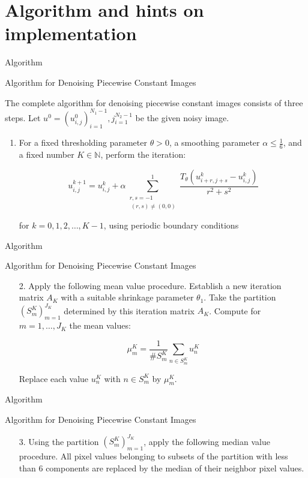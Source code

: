 \documentclass{beamer}
\begin{document}
\section{Algorithm and hints on implementation}
\begin{frame}{Algorithm}
\begin{block}{Algorithm for Denoising Piecewise Constant Images}
    

The complete algorithm for denoising piecewise constant images consists of three steps. Let $u^0 = (u^0_{i,j})_{i=1}^{N_1 -1},j_{i=1}^{N_2-1}$ be the given noisy image.
\begin{enumerate}
    \item For a fixed thresholding parameter $\theta > 0$, a smoothing parameter $\alpha \leq \frac{1}{6}$, and a fixed number $K \in \mathbb{N}$, perform the iteration:

\[
u^{k+1}_{i,j} = u^k_{i,j} + \alpha \sum_{\substack{r,s=-1 \\ \ (r,s) \neq (0,0)}}^{1} \frac{T_{\theta}(u^k_{i+r,j+s} - u^k_{i,j})}{r^2 + s^2}
\]

for $k = 0, 1, 2, \ldots, K-1$, using periodic boundary conditions

\end{enumerate}
\end{block}
  
\end{frame}
\begin{frame}{Algorithm}
\begin{block}{Algorithm for Denoising Piecewise Constant Images}
    

\begin{enumerate}
    \item[2.] Apply the following mean value procedure. Establish a new iteration matrix $A_K$  with a suitable shrinkage parameter $\theta_1$. Take the partition $(S^K_m)^{J_K}_{m=1}$ determined by this iteration matrix $A_K$. Compute for $m = 1, \ldots, J_K$ the mean values:

\[
\mu^K_m = \frac{1}{{\#S^K_m}} \sum_{n \in S^K_m} u^K_n
\]

Replace each value $u^K_n$ with $n \in S^K_m$ by $\mu^K_m$.

\end{enumerate}
\end{block}
  
\end{frame}


\begin{frame}{Algorithm}
\begin{block}{Algorithm for Denoising Piecewise Constant Images}
    

\begin{enumerate}
    \item[3.] Using the partition $(S^K_m)^{J_K}_{m=1}$, apply the following median value procedure. All pixel values belonging to subsets of the partition with less than 6 components are replaced by the median of their neighbor pixel values.

\end{enumerate}
\end{block}
  
\end{frame}
\end{document}
